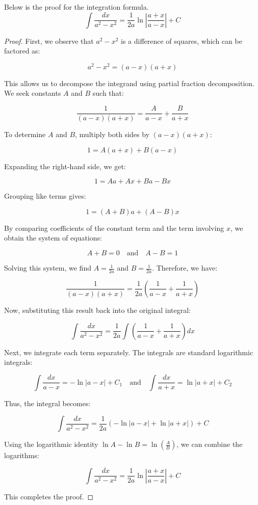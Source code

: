 \documentclass[12pt,a4paper]{article}
\begin{document}
\begin{remark}
    Below is the proof for the integration formula.
\[
\int \frac{dx}{a^2 - x^2} = \frac{1}{2a} \ln \left| \frac{a + x}{a - x} \right| + C
\]

\begin{proof}
First, we observe that \( a^2 - x^2 \) is a difference of squares, which can be factored as:

\[
a^2 - x^2 = (a - x)(a + x)
\]

This allows us to decompose the integrand using partial fraction decomposition. We seek constants \( A \) and \( B \) such that:

\[
\frac{1}{(a - x)(a + x)} = \frac{A}{a - x} + \frac{B}{a + x}
\]

To determine \( A \) and \( B \), multiply both sides by \( (a - x)(a + x) \):

\[
1 = A(a + x) + B(a - x)
\]

Expanding the right-hand side, we get:

\[
1 = A a + A x + B a - B x
\]

Grouping like terms gives:

\[
1 = (A + B)a + (A - B)x
\]

By comparing coefficients of the constant term and the term involving \( x \), we obtain the system of equations:

\[
A + B = 0 \quad \text{and} \quad A - B = 1
\]

Solving this system, we find \( A = \frac{1}{2a} \) and \( B = \frac{1}{2a} \). Therefore, we have:

\[
\frac{1}{(a - x)(a + x)} = \frac{1}{2a} \left( \frac{1}{a - x} + \frac{1}{a + x} \right)
\]

Now, substituting this result back into the original integral:

\[
\int \frac{dx}{a^2 - x^2} = \frac{1}{2a} \int \left( \frac{1}{a - x} + \frac{1}{a + x} \right) dx
\]

Next, we integrate each term separately. The integrals are standard logarithmic integrals:

\[
\int \frac{dx}{a - x} = -\ln |a - x| + C_1 \quad \text{and} \quad \int \frac{dx}{a + x} = \ln |a + x| + C_2
\]

Thus, the integral becomes:

\[
\int \frac{dx}{a^2 - x^2} = \frac{1}{2a} \left( -\ln |a - x| + \ln |a + x| \right) + C
\]

Using the logarithmic identity \( \ln A - \ln B = \ln \left( \frac{A}{B} \right) \), we can combine the logarithms:

\[
\int \frac{dx}{a^2 - x^2} = \frac{1}{2a} \ln \left| \frac{a + x}{a - x} \right| + C
\]

This completes the proof.
\end{proof}

\end{remark}
\end{document}

